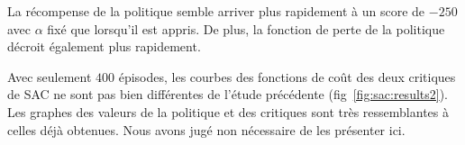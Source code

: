 La récompense de la politique semble arriver plus rapidement à un score de
\(-250\) avec \(\alpha\) fixé que lorsqu'il est appris. De plus, la fonction de
perte de la politique décroit également plus rapidement.

Avec seulement \(400\) épisodes, les courbes des fonctions de coût des deux
critiques de SAC ne sont pas bien différentes de l'étude précédente
(fig~\ref{fig:sac:results2}). Les graphes des valeurs de la politique et des
critiques sont très ressemblantes à celles déjà obtenues. Nous avons jugé non
nécessaire de les présenter ici.
